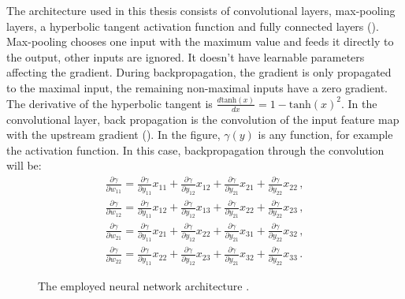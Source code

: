 The architecture used in this thesis consists of convolutional layers, max-pooling layers, a hyperbolic tangent activation function and fully connected layers (). Max-pooling chooses one input with the maximum value and feeds it directly to the output, other inputs are ignored. It doesn't have learnable parameters affecting the gradient. During backpropagation, the gradient is only propagated to the maximal input, the remaining non-maximal inputs have a zero gradient. The derivative of the hyperbolic tangent is $\frac{d\textrm{tanh}(x)}{dx} = 1-\textrm{tanh}(x)^2$. In the convolutional layer, back propagation is the convolution of the input feature map with the upstream gradient (). In the figure, $\gamma(y)$ is any function, for example the activation function. In this case, backpropagation through the convolution will be:
\begin{equation}
\begin{aligned}
	\frac{\partial \gamma}{\partial w_{11}} = \frac{\partial\gamma}{\partial y_{11}} x_{11} + \frac{\partial\gamma}{\partial y_{12}} x_{12} + \frac{\partial\gamma}{\partial y_{21}} x_{21} + \frac{\partial\gamma}{\partial y_{22}} x_{22}\,, \\
	\frac{\partial \gamma}{\partial w_{12}} = \frac{\partial\gamma}{\partial y_{11}} x_{12} + \frac{\partial\gamma}{\partial y_{12}} x_{13} + \frac{\partial\gamma}{\partial y_{21}} x_{22} + \frac{\partial\gamma}{\partial y_{22}} x_{23}\,, \\
	\frac{\partial \gamma}{\partial w_{21}} = \frac{\partial\gamma}{\partial y_{11}} x_{21} + \frac{\partial\gamma}{\partial y_{12}} x_{22} + \frac{\partial\gamma}{\partial y_{21}} x_{31} + \frac{\partial\gamma}{\partial y_{22}} x_{32}\,, \\
	\frac{\partial \gamma}{\partial w_{22}} = \frac{\partial\gamma}{\partial y_{11}} x_{22} + \frac{\partial\gamma}{\partial y_{12}} x_{23} + \frac{\partial\gamma}{\partial y_{21}} x_{32} + \frac{\partial\gamma}{\partial y_{22}} x_{33}\,.
\end{aligned}
\end{equation}

\begin{figure}[H]
  \centering
  
  
  
  \caption{The employed neural network architecture \cite{giusti2016machine}.}
  \label{fig:architecture}
\end{figure}




